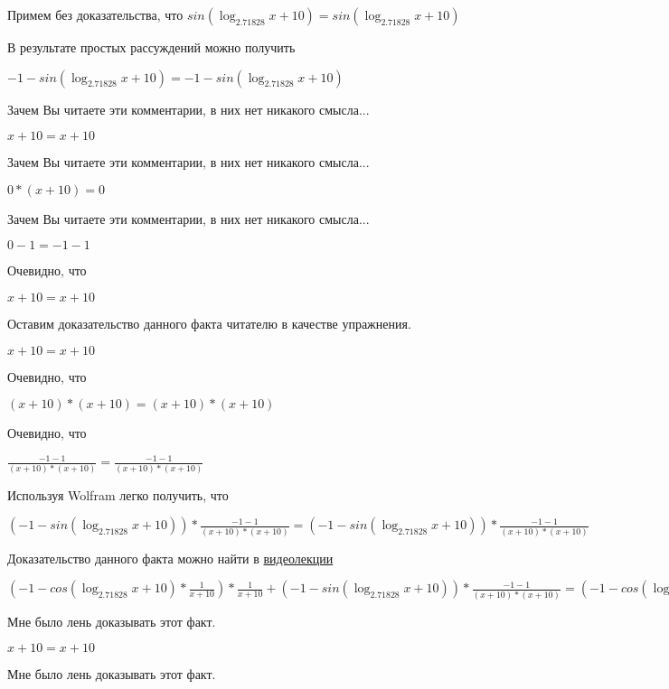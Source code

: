 \documentclass[12pt,a4paper,fleqn]{article}
\theoremstyle{definition}
\begin{document}
Примем без доказательства, что
$sin(\log_{ 2.71828 }{ x  +  10 }) = sin(\log_{ 2.71828 }{ x  +  10 })$

В результате простых рассуждений можно получить

$ -1  - sin(\log_{ 2.71828 }{ x  +  10 }) =  -1  - sin(\log_{ 2.71828 }{ x  +  10 })$

Зачем Вы читаете эти комментарии, в них нет никакого смысла...

$ x  +  10  =  x  +  10 $

Зачем Вы читаете эти комментарии, в них нет никакого смысла...

$ 0  * ( x  +  10 ) =  0 $

Зачем Вы читаете эти комментарии, в них нет никакого смысла...

$ 0  -  1  =  -1  -  1 $

Очевидно, что

$ x  +  10  =  x  +  10 $

Оставим доказательство данного факта читателю в качестве упражнения.

$ x  +  10  =  x  +  10 $

Очевидно, что

$( x  +  10 ) * ( x  +  10 ) = ( x  +  10 ) * ( x  +  10 )$

Очевидно, что

$\frac{ -1  -  1 }{( x  +  10 ) * ( x  +  10 )}
 = \frac{ -1  -  1 }{( x  +  10 ) * ( x  +  10 )}
$

Используя Wolfram легко получить, что

$( -1  - sin(\log_{ 2.71828 }{ x  +  10 })) * \frac{ -1  -  1 }{( x  +  10 ) * ( x  +  10 )}
 = ( -1  - sin(\log_{ 2.71828 }{ x  +  10 })) * \frac{ -1  -  1 }{( x  +  10 ) * ( x  +  10 )}
$

Доказательство данного факта можно найти в \href{https://www.youtube.com/watch?v=dQw4w9WgXcQ}{видеолекции}

$( -1  - cos(\log_{ 2.71828 }{ x  +  10 }) * \frac{ 1 }{ x  +  10 }
) * \frac{ 1 }{ x  +  10 }
 + ( -1  - sin(\log_{ 2.71828 }{ x  +  10 })) * \frac{ -1  -  1 }{( x  +  10 ) * ( x  +  10 )}
 = ( -1  - cos(\log_{ 2.71828 }{ x  +  10 }) * \frac{ 1 }{ x  +  10 }
) * \frac{ 1 }{ x  +  10 }
 + ( -1  - sin(\log_{ 2.71828 }{ x  +  10 })) * \frac{ -1  -  1 }{( x  +  10 ) * ( x  +  10 )}
$

Мне было лень доказывать этот факт.

$ x  +  10  =  x  +  10 $

Мне было лень доказывать этот факт.
\end{document}
